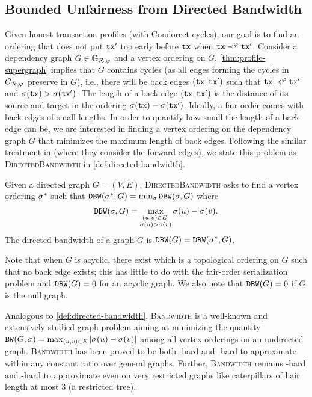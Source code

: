 \subsection{Bounded Unfairness from Directed Bandwidth}
\label{subsec:order-fairness-from-directed-bandwidth}

Given honest transaction profiles \profileSet (with Condorcet cycles), our goal is to find an ordering that does not put $\mathtt{tx}'$ too early before $\mathtt{tx}$ when $\mathtt{tx} \prec^\varphi \mathtt{tx}'$.
%
Consider a dependency graph $G \in \mathbb{G}_{\mathcal{R}, \varphi}$ and a vertex ordering \orderOutput on $G$.
%
\cref{thm:profile-supergraph} implies that $G$ contains cycles (as all edges forming the cycles in $G_{\mathcal{R}, \varphi}$ preserve in $G$), i.e., there will be back edges $(\mathtt{tx}, \mathtt{tx}')$ such that $\mathtt{tx} \prec^\varphi \mathtt{tx}'$ and $\sigma(\mathtt{tx}) > \sigma(\mathtt{tx}')$.
%
The length of a back edge $(\mathtt{tx}, \mathtt{tx}')$ is the distance of its source and target in the ordering $\sigma(\mathtt{tx}) - \sigma(\mathtt{tx}')$.
%
Ideally, a fair order comes with back edges of small lengths.
%
In order to quantify how small the length of a back edge can be, we are interested in finding a vertex ordering on the dependency graph $G$ that minimizes the maximum length of back edges.
%
Following the similar treatment in \cite{FSTTCS:JKLSS19} (where they consider the forward edges), we state this problem as \textsc{DirectedBandwidth} in \cref{def:directed-bandwidth}.

\begin{definition}
    \label{def:directed-bandwidth}

    Given a directed graph $G = (V, E)$, \textsc{DirectedBandwidth} asks to find a vertex ordering $\sigma^*$ such that $\mathtt{DBW}(\sigma^*, G) = \min_{\sigma} \mathtt{DBW}(\sigma, G)$ where
    \[ \mathtt{DBW}(\sigma, G) = \max_{\substack{(u, v) \in E,\\\sigma(u) > \sigma(v)}} \sigma(u) - \sigma(v). \]
    The directed bandwidth of a graph $G$ is $\mathtt{DBW}(G) = \mathtt{DBW}(\sigma^*, G)$.
\end{definition}

Note that when $G$ is acyclic, there exist \orderOutput which is a topological ordering on $G$ such that no back edge exists; this has little to do with the fair-order serialization problem and $\mathtt{DBW}(G) = 0$ for an acyclic graph.
%
We also note that $\mathtt{DBW}(G) = 0$ if $G$ is the null graph.

Analogous to \cref{def:directed-bandwidth}, \textsc{Bandwidth} \cite{JGT:CCDG82,SWAT:Feige00,CygPil08} is a well-known and extensively studied graph problem aiming at minimizing the quantity $\mathtt{BW}(G, \sigma) = \max_{(u, v)\in E} |\sigma(u) - \sigma(v)|$ among all vertex orderings on an undirected graph.
%
\textsc{Bandwidth} has been proved to be both \NP-hard \cite{Papadimitriou76} and \NP-hard to approximate within any constant ratio \cite{JCSS:DFU11} over general graphs.
%
Further, \textsc{Bandwidth} remains \NP-hard and \NP-hard to approximate even on very restricted graphs like caterpillars of hair length at most 3 (a restricted tree).

